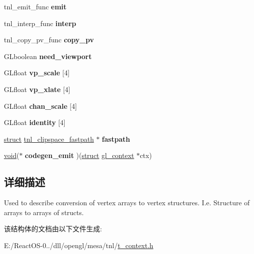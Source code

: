\begin{DoxyCompactItemize}
tnl\+\_\+emit\+\_\+func {\bfseries emit}
\item 
\mbox{\label{structtnl__clipspace_a182c97c9f159285b74992212ee98ebec}} 
tnl\+\_\+interp\+\_\+func {\bfseries interp}
\item 
\mbox{\label{structtnl__clipspace_a941c31a53c3f79a2510da321d7455e6f}} 
tnl\+\_\+copy\+\_\+pv\+\_\+func {\bfseries copy\+\_\+pv}
\item 
\mbox{\label{structtnl__clipspace_a3ae210b76b1073e4831db1164df07773}} 
G\+Lboolean {\bfseries need\+\_\+viewport}
\item 
\mbox{\label{structtnl__clipspace_a94d62791e01f2704defacd680d23b06f}} 
G\+Lfloat {\bfseries vp\+\_\+scale} \mbox{[}4\mbox{]}
\item 
\mbox{\label{structtnl__clipspace_ab20e4b9d212ee95fd85b60bcd2b55ade}} 
G\+Lfloat {\bfseries vp\+\_\+xlate} \mbox{[}4\mbox{]}
\item 
\mbox{\label{structtnl__clipspace_ad081514af4ea33561c7fd3d8fe5372c9}} 
G\+Lfloat {\bfseries chan\+\_\+scale} \mbox{[}4\mbox{]}
\item 
\mbox{\label{structtnl__clipspace_a7626e1c4c7d4da1d1b9bf54d3d8cf66a}} 
G\+Lfloat {\bfseries identity} \mbox{[}4\mbox{]}
\item 
\mbox{\label{structtnl__clipspace_a81d3f3ca1d7fce42e36005432a235a8c}} 
\hyperlink{interfacestruct}{struct} \hyperlink{structtnl__clipspace__fastpath}{tnl\+\_\+clipspace\+\_\+fastpath} $\ast$ {\bfseries fastpath}
\item 
\mbox{\label{structtnl__clipspace_a0dd418cb59d30273188ca4b9ede78bd7}} 
\hyperlink{interfacevoid}{void}($\ast$ {\bfseries codegen\+\_\+emit} )(\hyperlink{interfacestruct}{struct} \hyperlink{structgl__context}{gl\+\_\+context} $\ast$ctx)
\end{DoxyCompactItemize}


\subsection{详细描述}
Used to describe conversion of vertex arrays to vertex structures. I.\+e. Structure of arrays to arrays of structs. 

该结构体的文档由以下文件生成\+:\begin{DoxyCompactItemize}
\item 
E\+:/\+React\+O\+S-\/0../dll/opengl/mesa/tnl/\hyperlink{t__context_8h}{t\+\_\+context.\+h}\end{DoxyCompactItemize}
